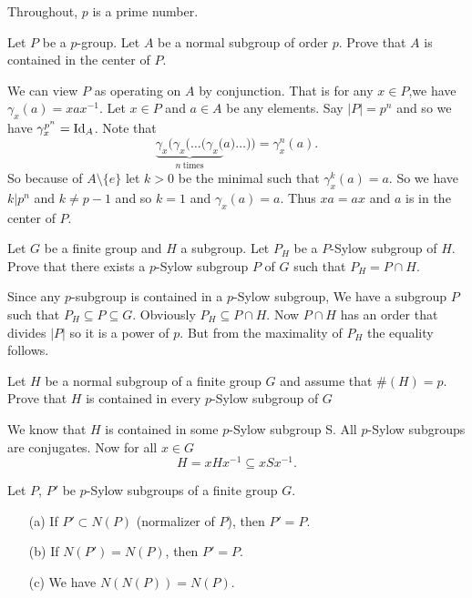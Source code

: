 \documentclass[12pt]{book}
\newcommand{\eG}{\ensuremath{\{e\}}}
\def\Id{\mathop{\rm Id}\nolimits}
\newcounter{myenumi}
\newenvironment{myenumerate}
{\begin{enumerate}
 \setcounter{enumi}{\themyenumi}
}
{\setcounter{myenumi}{\theenumi}
 \end{enumerate}}
\begin{document}
Throughout, $p$ is a prime number.

\iffalse
\item[]
 \setlength{\leftmargin}{0pt}
 \setlength{\labelwidth}{0pt}
 \setlength{\labelwidth}{0pt}
 Throughout, $p$ is a prime number.
\addtocounter{enumi}{-1}
\fi

\begin{myenumerate}
\begin{excopy}
Let $P$ be a $p$-group. Let $A$ be a normal subgroup of order $p$.
Prove that $A$ is contained in the center of $P$.
\end{excopy}

We can view $P$ as operating on $A$ by conjunction.
That is for any \(x\in P\),we have \(\gamma_x(a) = xax^{-1}\).
Let \(x\in P\) and \(a\in A\) be any elements.
Say \(|P|=p^n\)
and so we have \(\gamma_x^{p^n}=\Id_A\).
Note that
\[\underbrace{\gamma_x(\gamma_x(\ldots(\gamma_x(}_{n\ \textrm{times}}a)\ldots))
 =  \gamma_x^n(a).\]
So because of \(A\setminus\eG\)
let \(k>0\) be the minimal such that \(\gamma_x^k(a)=a\).
So we have \(k|p^n\) and \(k\neq p-1\) and so \(k=1\) and \(\gamma_x(a)=a\).
Thus \(xa=ax\) and $a$ is in the center of $P$.


\begin{excopy}
Let $G$ be a finite group and $H$ a subgroup. Let \(P_H\) be
a $P$-Sylow subgroup of $H$. Prove that there exists a $p$-Sylow subgroup $P$
  of $G$ such that \(P_H = P\cap H\).
\end{excopy}

Since any $p$-subgroup is contained in a $p$-Sylow subgroup,
We have a subgroup $P$ such that \(P_H\subseteq P\subseteq G\).
Obviously \(P_H\subseteq P\cap H\).
Now \(P\cap H\) has an order that divides \(|P|\) so it is a power of $p$.
But from the maximality of \(P_H\) the equality follows.

\begin{excopy}
Let $H$ be a normal subgroup of a finite group $G$
and assume that \(\#(H)=p\). Prove that $H$ is contained in every $p$-Sylow
subgroup of $G$
\end{excopy}

We know that $H$ is contained in some $p$-Sylow subgroup S.
All $p$-Sylow subgroups are conjugates. Now for all \(x\in G\)
\[H=xHx^{-1}\subseteq xSx^{-1}.\]


\begin{excopy}
Let $P$, \(P'\) be $p$-Sylow subgroups of a finite group $G$.
\begin{itemize}
 \item[(a)]  If \(P'\subset N(P)\) (normalizer of $P$), then \(P'=P\).
 \item[(b)]  If \(N(P')=N(P)\), then \(P'=P\).
 \item[(c)]  We have \(N(N(P))=N(P)\).
\end{itemize}
\end{excopy}


\end{myenumerate}
\end{document}
